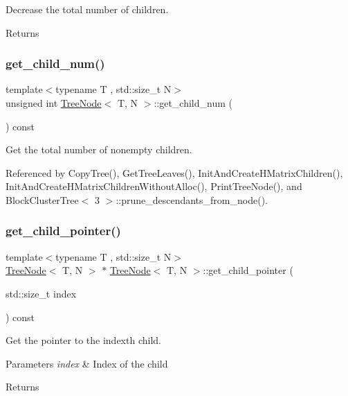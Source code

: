 Decrease the total number of children. \begin{DoxyReturn}{Returns}

\end{DoxyReturn}
\mbox{\label{classTreeNode_a077cb5cc974f94ff431c69cc2ca5957f}} 
\subsubsection{\texorpdfstring{get\+\_\+child\+\_\+num()}{get\_child\_num()}}
{\footnotesize\ttfamily template$<$typename T , std\+::size\+\_\+t N$>$ \\
unsigned int \hyperlink{classTreeNode}{Tree\+Node}$<$ T, N $>$\+::get\+\_\+child\+\_\+num (\begin{DoxyParamCaption}{ }\end{DoxyParamCaption}) const}

Get the total number of nonempty children. 

Referenced by Copy\+Tree(), Get\+Tree\+Leaves(), Init\+And\+Create\+H\+Matrix\+Children(), Init\+And\+Create\+H\+Matrix\+Children\+Without\+Alloc(), Print\+Tree\+Node(), and Block\+Cluster\+Tree$<$ 3 $>$\+::prune\+\_\+descendants\+\_\+from\+\_\+node().

\mbox{\label{classTreeNode_ad3b1833452c787d2146a4beb3587c531}} 
\subsubsection{\texorpdfstring{get\+\_\+child\+\_\+pointer()}{get\_child\_pointer()}}
{\footnotesize\ttfamily template$<$typename T , std\+::size\+\_\+t N$>$ \\
\hyperlink{classTreeNode}{Tree\+Node}$<$ T, N $>$ $\ast$ \hyperlink{classTreeNode}{Tree\+Node}$<$ T, N $>$\+::get\+\_\+child\+\_\+pointer (\begin{DoxyParamCaption}\item[{std\+::size\+\_\+t}]{index }\end{DoxyParamCaption}) const}

Get the pointer to the {\ttfamily index\textquotesingle{}th} child. 
\begin{DoxyParams}{Parameters}
{\em index} & Index of the child \\
\hline
\end{DoxyParams}
\begin{DoxyReturn}{Returns}

\end{DoxyReturn}


